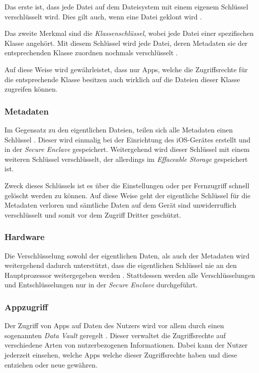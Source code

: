 Das erste ist, dass jede Datei auf dem Dateisystem mit einem eigenem Schlüssel
verschlüsselt wird. Dies gilt auch, wenn eine Datei geklont wird \cite[S.
49]{apple2020}.

Das zweite Merkmal sind die \textit{Klassenschlüssel}, wobei jede Datei einer
spezifischen Klasse angehört. Mit diesem Schlüssel wird jede Datei, deren
Metadaten sie der entsprechenden Klasse zuordnen nochmals verschlüsselt \cite[S.
49]{apple2020}.

Auf diese Weise wird gewährleistet, dass nur Apps, welche die Zugriffsrechte für
die entsprechende Klasse besitzen auch wirklich auf die Dateien dieser Klasse
zugreifen können.

\subsubsection{Metadaten}
Im Gegensatz zu den eigentlichen Dateien, teilen sich alle Metadaten einen
Schlüssel \cite[S. 50]{apple2020}. Dieser wird einmalig bei der Einrichtung des
iOS-Gerätes erstellt und in der \textit{Secure Enclave} gespeichert.
Weitergehend wird dieser Schlüssel mit einem weiteren Schlüssel verschlüsselt,
der allerdings im \textit{Effaceable Storage} gespeichert ist.

Zweck dieses Schlüssels ist es über die Einstellungen oder per Fernzugriff
schnell gelöscht werden zu können. Auf diese Weise geht der eigentliche
Schlüssel für die Metadaten verloren und sämtliche Daten auf dem Gerät sind
unwiderruflich verschlüsselt und somit vor dem Zugriff Dritter geschützt.

\subsubsection{Hardware}
Die Verschlüsselung sowohl der eigentlichen Daten, als auch der Metadaten wird
weitergehend dadurch unterstützt, dass die eigentlichen Schlüssel nie an den
Hauptprozessor weitergegeben werden \cite[S. 50]{apple2020}. Stattdessen werden
alle Verschlüsselungen und Entschlüsselungen nur in der \textit{Secure Enclave}
durchgeführt.

\subsubsection{Appzugriff}
Der Zugriff von Apps auf Daten des Nutzers wird vor allem durch einen
sogenannten \textit{Data Vault} geregelt \cite[S. 47]{apple2020}. Dieser
verwaltet die Zugriffsrechte auf verschiedene Arten von nutzerbezogenen
Informationen. Dabei kann der Nutzer jederzeit einsehen, welche Apps welche
dieser Zugriffsrechte haben und diese entziehen oder neue gewähren.

